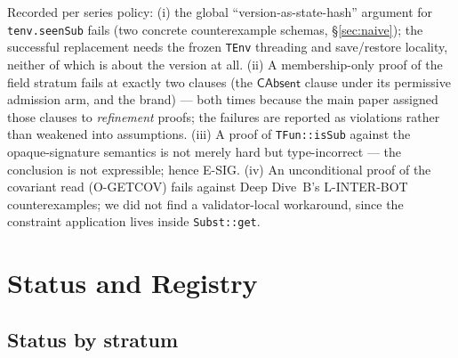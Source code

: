 \documentclass[11pt]{article}
\begin{document}
Recorded per series policy: (i) the global ``version-as-state-hash''
argument for \texttt{tenv.seenSub} fails (two concrete counterexample
schemas, \S\ref{sec:naive}); the successful replacement needs the frozen
\texttt{TEnv} threading and save/restore locality, neither of which is
about the version at all. (ii) A membership-only proof of the field
stratum fails at exactly two clauses (the $\mathsf{CAbsent}$ clause
under its permissive admission arm, and the brand) --- both times
because the main paper assigned those clauses to \emph{refinement}
proofs; the failures are reported as violations rather than weakened
into assumptions. (iii) A proof of \texttt{TFun::isSub} against the
opaque-signature semantics is not merely hard but type-incorrect --- the
conclusion is not expressible; hence E-SIG. (iv) An unconditional proof
of the covariant read (O-GETCOV) fails against Deep Dive~B's L-INTER-BOT
counterexamples; we did not find a validator-local workaround, since the
constraint application lives inside \texttt{Subst::get}.

\section{Status and Registry}
\label{sec:status}

\subsection{Status by stratum}
\end{document}
